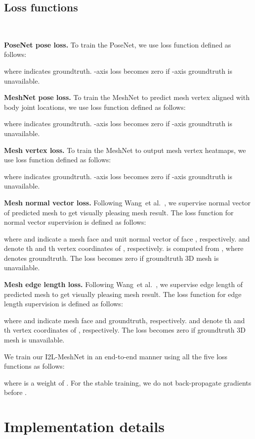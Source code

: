 \documentclass[runningheads]{llncs}
\begin{document}
\subsection{Loss functions} ~\label{section:loss_functions}

\textbf{PoseNet pose loss.}
To train the PoseNet, we use  loss function defined as follows:

where  indicates groundtruth. 
-axis loss becomes zero if -axis groundtruth is unavailable.

\textbf{MeshNet pose loss.}
To train the MeshNet to predict mesh vertex aligned with body joint locations, we use  loss function defined as follows:

where  indicates groundtruth. 
-axis loss becomes zero if -axis groundtruth is unavailable.

\textbf{Mesh vertex loss.}
To train the MeshNet to output mesh vertex heatmaps, we use  loss function defined as follows:

where  indicates groundtruth. 
-axis loss becomes zero if -axis groundtruth is unavailable.

\textbf{Mesh normal vector loss.}
Following Wang~et al.~\cite{wang2018pixel2mesh}, we supervise normal vector of predicted mesh to get visually pleasing mesh result. The  loss function for normal vector supervision is defined as follows:

where  and  indicate a mesh face and unit normal vector of face , respectively. 
 and  denote th and th vertex coordinates of , respectively.
 is computed from , where  denotes groundtruth. 
The loss becomes zero if groundtruth 3D mesh is unavailable.

\textbf{Mesh edge length loss.}
Following Wang~et al.~\cite{wang2018pixel2mesh}, we supervise edge length of predicted mesh to get visually pleasing mesh result. The  loss function for edge length supervision is defined as follows:

where  and  indicate mesh face and groundtruth, respectively. 
 and  denote th and th vertex coordinates of , respectively.
The loss becomes zero if groundtruth 3D mesh is unavailable.

We train our I2L-MeshNet in an end-to-end manner using all the five loss functions as follows:

where  is a weight of .
For the stable training, we do not back-propagate gradients before .

 \section{Implementation details}~\label{section:implementation_details}
\end{document}
